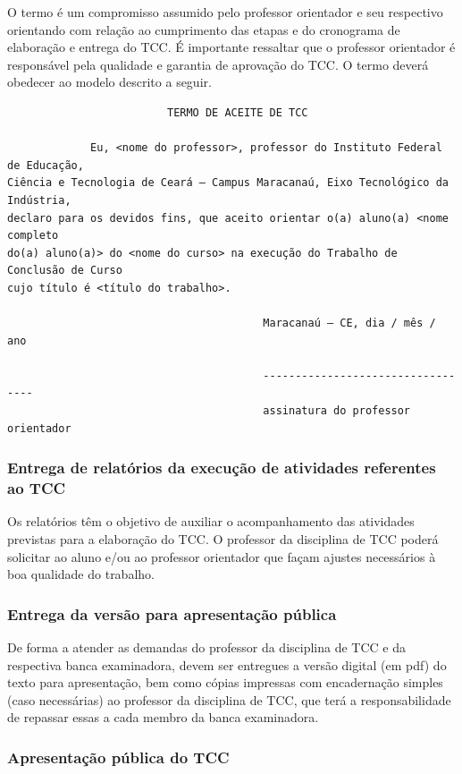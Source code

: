 \documentclass{paper}
\begin{document}
O termo é um compromisso assumido pelo professor orientador e seu respectivo orientando com relação ao cumprimento das
etapas e do cronograma de elaboração e entrega do TCC. É importante ressaltar que o professor orientador é responsável
pela qualidade e garantia de aprovação do TCC. O termo deverá obedecer ao modelo descrito a seguir.

\begin{verbatim}
                         TERMO DE ACEITE DE TCC

             Eu, <nome do professor>, professor do Instituto Federal de Educação,
Ciência e Tecnologia de Ceará – Campus Maracanaú, Eixo Tecnológico da Indústria,
declaro para os devidos fins, que aceito orientar o(a) aluno(a) <nome completo
do(a) aluno(a)> do <nome do curso> na execução do Trabalho de Conclusão de Curso
cujo título é <título do trabalho>.

                                        Maracanaú – CE, dia / mês / ano

                                        ----------------------------------
                                        assinatura do professor orientador

\end{verbatim}

\subsubsection{Entrega de relatórios da execução de atividades referentes ao TCC}

Os relatórios têm o objetivo de auxiliar o acompanhamento das atividades previstas para a elaboração do TCC. O
professor da disciplina de TCC poderá solicitar ao aluno e/ou ao professor orientador que façam ajustes necessários à
boa qualidade do trabalho.

\subsubsection{Entrega da versão para apresentação pública}

 De forma a atender as demandas do professor da disciplina de TCC e da respectiva banca examinadora, devem ser entregues a versão digital (em pdf) do texto para apresentação, bem como cópias impressas com encadernação simples (caso necessárias) ao professor da disciplina de TCC, que terá a responsabilidade de repassar essas a cada membro da banca examinadora.

\subsubsection{Apresentação pública do TCC}
\end{document}
